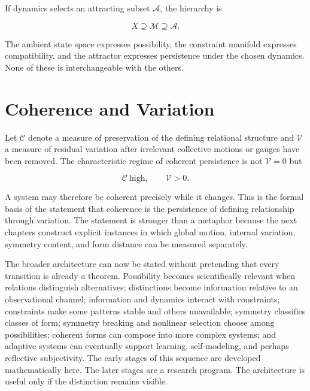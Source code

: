 If dynamics selects an attracting subset $\mathcal A$, the hierarchy is

\[
X\supseteq\mathcal M\supseteq\mathcal A.
\]

The ambient state space expresses possibility, the constraint manifold expresses compatibility, and the attractor expresses persistence under the chosen dynamics. None of these is interchangeable with the others.

\section{Coherence and Variation}

Let $\mathscr C$ denote a measure of preservation of the defining relational structure and $\mathscr V$ a measure of residual variation after irrelevant collective motions or gauges have been removed. The characteristic regime of coherent persistence is not $\mathscr V=0$ but

\[
\mathscr C\ \text{high},\qquad \mathscr V>0.
\]

A system may therefore be coherent precisely while it changes. This is the formal basis of the statement that coherence is the persistence of defining relationship through variation. The statement is stronger than a metaphor because the next chapters construct explicit instances in which global motion, internal variation, symmetry content, and form distance can be measured separately.

The broader architecture can now be stated without pretending that every transition is already a theorem. Possibility becomes scientifically relevant when relations distinguish alternatives; distinctions become information relative to an observational channel; information and dynamics interact with constraints; constraints make some patterns stable and others unavailable; symmetry classifies classes of form; symmetry breaking and nonlinear selection choose among possibilities; coherent forms can compose into more complex systems; and adaptive systems can eventually support learning, self-modeling, and perhaps reflective subjectivity. The early stages of this sequence are developed mathematically here. The later stages are a research program. The architecture is useful only if the distinction remains visible.
